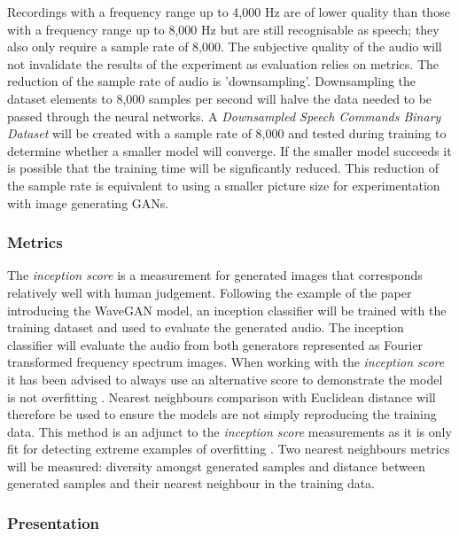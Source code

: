 \documentclass[a4paper, dvipsnames, titlepage]{article}
\begin{document}
Recordings with a frequency range up to 4,000 Hz are of lower quality than those with a frequency range up to 8,000 Hz but are still recognisable as speech; they also only require a sample rate of 8,000.
The subjective quality of the audio will not invalidate the results of the experiment as evaluation relies on metrics.
\newline
\newline
The reduction of the sample rate of audio is 'downsampling'.
Downsampling the dataset elements to 8,000 samples per second will halve the data needed to be passed through the neural networks.
A \textit{Downsampled Speech Commands Binary Dataset} will be created with a sample rate of 8,000 and tested during training to determine whether a smaller model will converge.
If the smaller model succeeds it is possible that the training time will be signficantly reduced.
This reduction of the sample rate is equivalent to using a smaller picture size for experimentation with image generating GANs.

\subsubsection{Metrics}

The \textit{inception score} is a measurement for generated images that corresponds relatively well with human judgement.
Following the example of the paper introducing the WaveGAN model, an inception classifier will be trained with the training dataset and used to evaluate the generated audio.
The inception classifier will evaluate the audio from both generators represented as Fourier transformed frequency spectrum images.
\newline
\newline
When working with the \textit{inception score} it has been advised to always use an alternative score to demonstrate the model is not overfitting \citep{2018arXiv180101973B}.
Nearest neighbours comparison with Euclidean distance will therefore be used to ensure the models are not simply reproducing the training data.
This method is an adjunct to the \textit{inception score} measurements as it is only fit for detecting extreme examples of overfitting \citep{2015arXiv151101844T}.
Two nearest neighbours metrics will be measured: diversity amongst generated samples and distance between generated samples and their nearest neighbour in the training data.

\subsubsection{Presentation}
\end{document}

